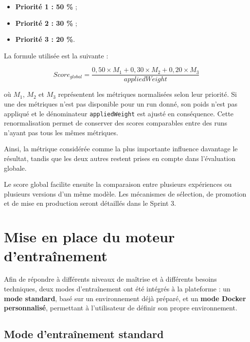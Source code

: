 \begin{itemize}
    \item \textbf{Priorité 1 : 50 \%} ;
    \item \textbf{Priorité 2 : 30 \%} ;
    \item \textbf{Priorité 3 : 20 \%}.
\end{itemize}

La formule utilisée est la suivante :

\[
\boxed{
Score_{global}
=
\frac{0{,}50 \times M_{1} + 0{,}30 \times M_{2} + 0{,}20 \times M_{3}}
{appliedWeight}
}
\]

où $M_{1}$, $M_{2}$ et $M_{3}$ représentent les métriques
normalisées selon leur priorité. Si une des métriques n'est pas
disponible pour un run donné, son poids n'est pas appliqué et le
dénominateur \texttt{appliedWeight} est ajusté en conséquence. Cette
renormalisation permet de conserver des scores comparables entre
des runs n'ayant pas tous les mêmes métriques.

Ainsi, la métrique considérée comme la plus importante influence
davantage le résultat, tandis que les deux autres restent prises en
compte dans l'évaluation globale.

Le score global facilite ensuite la comparaison entre plusieurs
expériences ou plusieurs versions d'un même modèle. Les mécanismes de
sélection, de promotion et de mise en production seront détaillés dans
le Sprint 3.



\section{Mise en place du moteur d'entraînement}
\label{sec:sprint2-training-engine}

Afin de répondre à différents niveaux de maîtrise et à différents
besoins techniques, deux modes d'entraînement ont été intégrés à la
plateforme : un \textbf{mode standard}, basé sur un environnement déjà
préparé, et un \textbf{mode Docker personnalisé}, permettant à
l'utilisateur de définir son propre environnement.

\subsection{Mode d'entraînement standard}
\label{subsec:sprint2-standard}


